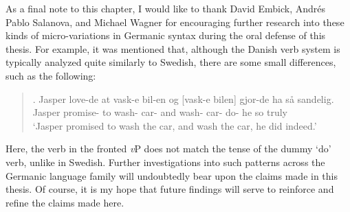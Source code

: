 As a final note to this chapter, I would like to thank David Embick, Andr\'{e}s Pablo Salanova, and Michael Wagner for encouraging further research into these kinds of micro-variations in Germanic syntax during the oral defense of this thesis. For example, it was mentioned that, although the Danish verb system is typically analyzed quite similarly to Swedish, there are some small differences, such as the following:

\begin{quote}
\exg. Jasper love-de at vask-e bil-en og [vask-e bilen] gjor-de ha s\r{a} sandelig.\\
Jasper promise-\mbox{} to wash-\mbox{} car-\mbox{} and wash-\mbox{} car-\mbox{} do-\mbox{} he so truly\\
`Jasper promised to wash the car, and wash the car, he did indeed.'

\end{quote}
Here, the verb in the fronted {\it v}P does not match the tense of the dummy `do' verb, unlike in Swedish. Further investigations into such patterns across the Germanic language family will undoubtedly bear upon the claims made in this thesis. Of course, it is my hope that future findings will serve to reinforce and refine the claims made here.

